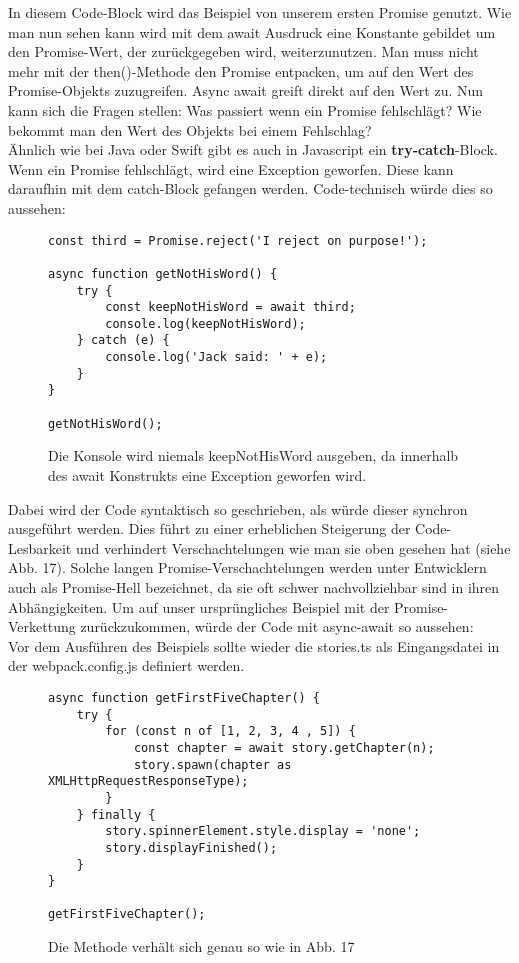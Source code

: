 \noindent
In diesem Code-Block wird das Beispiel von unserem ersten Promise genutzt. Wie man nun sehen kann wird mit dem await Ausdruck eine Konstante gebildet um den Promise-Wert, der zurückgegeben wird, weiterzunutzen. Man muss nicht mehr mit der then()-Methode den Promise entpacken, um auf den Wert des Promise-Objekts zuzugreifen. Async await greift direkt auf den Wert zu. Nun kann sich die Fragen stellen: Was passiert wenn ein Promise fehlschlägt? Wie bekommt man den Wert des Objekts bei einem Fehlschlag? \\

\noindent
Ähnlich wie bei Java oder Swift gibt es auch in Javascript ein \textbf{try-catch}-Block. Wenn ein Promise fehlschlägt, wird eine Exception geworfen.\cite{async-await-heise} Diese kann daraufhin mit dem catch-Block gefangen werden. Code-technisch würde dies so aussehen:

\begin{figure}[H]
\begin{lstlisting}
const third = Promise.reject('I reject on purpose!');

async function getNotHisWord() {
    try {
        const keepNotHisWord = await third;
        console.log(keepNotHisWord);
    } catch (e) {
        console.log('Jack said: ' + e);
    }
}

getNotHisWord();
\end{lstlisting}
\caption{Die Konsole wird niemals keepNotHisWord ausgeben, da innerhalb des await Konstrukts eine Exception geworfen wird.}
\end{figure}

\noindent
Dabei wird der Code syntaktisch so geschrieben, als würde dieser synchron ausgeführt werden. Dies führt zu einer erheblichen Steigerung der Code-Lesbarkeit und verhindert Verschachtelungen wie man sie oben gesehen hat (siehe Abb. 17). Solche langen Promise-Verschachtelungen werden unter Entwicklern auch als \glqq{}Promise-Hell\grqq{} bezeichnet, da sie oft schwer nachvollziehbar sind in ihren Abhängigkeiten. Um auf unser ursprüngliches Beispiel mit der Promise-Verkettung zurückzukommen, würde der Code mit async-await so aussehen:\\

\noindent
Vor dem Ausführen des Beispiels sollte wieder die stories.ts als Eingangsdatei in der webpack.config.js definiert werden.

\begin{figure}[H]
\begin{lstlisting}
async function getFirstFiveChapter() {
    try {
        for (const n of [1, 2, 3, 4 , 5]) {
            const chapter = await story.getChapter(n);
            story.spawn(chapter as XMLHttpRequestResponseType);
        }
    } finally {
        story.spinnerElement.style.display = 'none';
        story.displayFinished();
    }
}

getFirstFiveChapter();
\end{lstlisting}
\caption{Die Methode verhält sich genau so wie in Abb. 17}
\end{figure}

